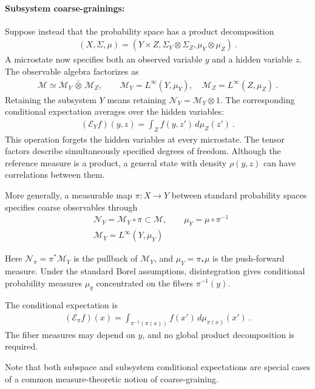 \documentclass[a4paper,11pt]{article}
\theoremstyle{definition}
\newcommand{\nn}{\nonumber}
\begin{document}
\paragraph{Subsystem coarse-grainings:}
Suppose instead that the probability space has a product decomposition
\begin{align}
    (X,\Sigma,\mu)=(Y\times Z,\Sigma_Y\otimes\Sigma_Z,\mu_Y\otimes\mu_Z)\ .
\end{align}
A microstate now specifies both an observed variable $y$ and a hidden variable $z$. The observable algebra factorizes as
\begin{align}
    \mathcal M\simeq\mathcal M_Y\,\bar\otimes\,\mathcal M_Z,
    \qquad \mathcal M_Y=L^\infty(Y,\mu_Y),\quad
    \mathcal M_Z=L^\infty(Z,\mu_Z)\ .
\end{align}
Retaining the subsystem $Y$ means retaining $\mathcal N_Y=\mathcal M_Y\otimes 1$. The corresponding conditional expectation averages over the hidden variables:
\begin{align}
    (\mathcal{E}_Y f)(y,z)=\int_Z f(y,z')\,d\mu_Z(z')\ .
\end{align}
This operation forgets the hidden variables at every microstate. The tensor factors describe simultaneously specified degrees of freedom. Although the reference measure is a product, a general state with density $\rho(y,z)$ can have correlations between them. 

More generally, a measurable map $\pi:X\to Y$ between standard probability spaces specifies coarse observables through
\begin{align}
    &\mathcal N_Y=\mathcal M_Y\circ \pi\subset \mathcal M,
    \qquad \mu_Y=\mu\circ \pi^{-1}\nn\\
    &\mathcal M_Y=L^\infty(Y,\mu_Y)
\end{align}

Here $\mathcal N_\pi=\pi^*\mathcal M_Y$ is the pullback of $\mathcal M_Y$, and $\mu_Y=\pi_*\mu$ is the
push-forward measure. Under the standard Borel assumptions, disintegration gives
conditional probability measures $\mu_y$ concentrated on the fibers $\pi^{-1}(y)$.

The conditional expectation is
\begin{align}
    (\mathcal{E}_\pi f)(x)=\int_{\pi^{-1}(\pi(x))}f(x')\,d\mu_{\pi(x)}(x')\ .
\end{align}
The fiber measures may depend on $y$, and no global product decomposition is required. 

Note that both subspace and subsystem conditional expectations are special cases of a common measure-theoretic notion of coarse-graining.
\end{document}
